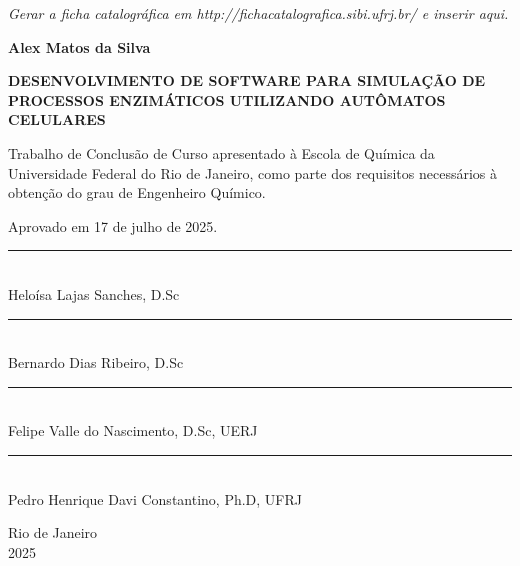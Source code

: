 \documentclass[12pt,oneside]{report}
\begin{document}
\newpage
{}
\vspace*{\fill}
\begin{center}
    \textit{Gerar a ficha catalográfica em http://fichacatalografica.sibi.ufrj.br/ e inserir aqui.}
\end{center}
\vspace*{\fill}
\newpage

\begin{center}
    \textbf{Alex Matos da Silva}

    \vspace{1cm}

    \textbf{DESENVOLVIMENTO DE SOFTWARE PARA SIMULAÇÃO DE PROCESSOS ENZIMÁTICOS UTILIZANDO AUTÔMATOS CELULARES}

    \vspace{0.5cm}

    \begin{adjustwidth}{8cm}{0cm}
        Trabalho de Conclusão de Curso apresentado à Escola de Química da Universidade Federal do Rio de Janeiro, como parte dos requisitos necessários à obtenção do grau de Engenheiro Químico.
    \end{adjustwidth}

    \vspace{0.5cm}

\end{center}

Aprovado em 17 de julho de 2025.

\begin{center}

    \vspace{2cm}

    \noindent\rule{10cm}{0.4pt}\\
    \noindent\hspace*{0.2cm}Heloísa Lajas Sanches, D.Sc

    \vspace{1cm}

    \noindent\rule{10cm}{0.4pt}\\
    \noindent\hspace*{0.2cm}Bernardo Dias Ribeiro, D.Sc

    \vspace{2cm}

    \noindent\rule{10cm}{0.4pt}\\
    \noindent\hspace*{0.2cm}Felipe Valle do Nascimento, D.Sc, UERJ

    \vspace{1cm}

    \noindent\rule{10cm}{0.4pt}\\
    \noindent\hspace*{0.2cm}Pedro Henrique Davi Constantino, Ph.D, UFRJ


    \vfill

    Rio de Janeiro \\
    2025
\end{center}
\newpage
\end{document}
